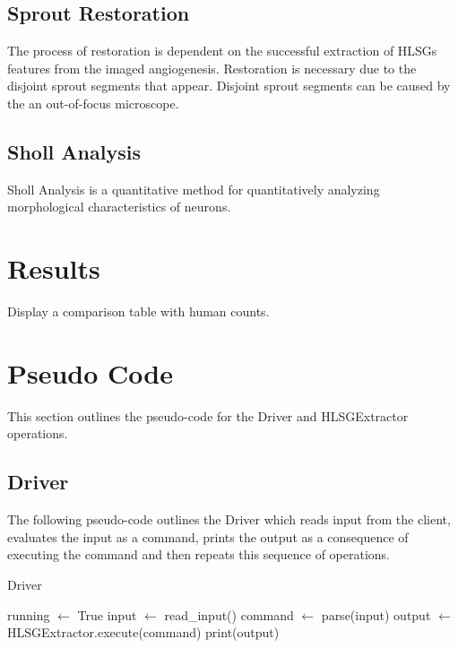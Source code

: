 \documentclass{sig-alternate}
\begin{document}
	\subsection{Sprout Restoration} %
	\label{sub:Sprout Restoration}
		The process of restoration is dependent on the successful
		extraction of HLSGs features from the imaged angiogenesis.
		Restoration is necessary due to the disjoint sprout segments that
		appear. Disjoint sprout segments can be caused by the an
		out-of-focus microscope. %

	\subsection{Sholl Analysis} %
	\label{sub:Sholl Analysis}
		Sholl Analysis is a quantitative method for quantitatively analyzing
		morphological characteristics of neurons. \cite{sholl53}

\section{Results} %
\label{sec:Results}
	Display a comparison table with human counts.




\appendix
\section{Pseudo Code} %
\label{sec:Pseudo Code}
	This section outlines the pseudo-code for the Driver and HLSGExtractor
	operations. 

	\subsection{Driver} %
	\label{sub:Driver}
		The following pseudo-code outlines the Driver which reads input from the
		client, evaluates the input as a command, prints the output as a
		consequence of executing the command and then repeats this sequence of
		operations.
		\begin{algorithm}[ht!]
			\caption{Driver}
			\begin{algorithmic}
					\State running $\gets$ True
						\State input $\gets$ read\_input()
						\State command $\gets$ parse(input)
						\State output $\gets$ HLSGExtractor.execute(command)
						\State print(output)
					\EndWhile
				\EndProcedure
			\end{algorithmic}
		\end{algorithm}
\end{document}
